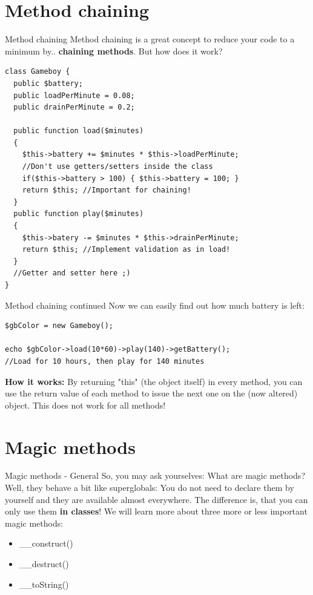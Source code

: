 \section{Method chaining}

\begin{frame}[fragile]{Method chaining}
Method chaining is a great concept to reduce your code to a minimum by.. \textbf{chaining methods}. But how does it work? \pause
\begin{lstlisting}
class Gameboy {
  public $battery;
  public loadPerMinute = 0.08;
  public drainPerMinute = 0.2;

  public function load($minutes)
  {
    $this->battery += $minutes * $this->loadPerMinute; 
    //Don't use getters/setters inside the class
 	if($this->battery > 100) { $this->battery = 100; }
    return $this; //Important for chaining!
  }
  public function play($minutes)
  {
    $this->batery -= $minutes * $this->drainPerMinute;
    return $this; //Implement validation as in load!
  }
  //Getter and setter here ;)
}
\end{lstlisting}
\end{frame}


\begin{frame}[fragile]{Method chaining continued}
Now we can easily find out how much battery is left: \pause
\begin{lstlisting}
$gbColor = new Gameboy();

echo $gbColor->load(10*60)->play(140)->getBattery();
//Load for 10 hours, then play for 140 minutes
\end{lstlisting} \pause
\textbf{How it works:} By returning "this" (the object itself) in every method, you can use the return value of each method to issue the next one on the (now altered) object. \pause This does not work for all methods!
\end{frame}


\section{Magic methods}

\begin{frame}[fragile]{Magic methods - General}
So, you may ask yourselves: What are magic methods? \pause
Well, they behave a bit like superglobals: You do not need to declare them by yourself and they are available almost everywhere. \pause The difference is, that you can only use them \textbf{in classes}! We will learn more about three more or less important magic methods: \pause
\begin{itemize}
	\item \_{}\_{}construct()
	\item \_{}\_{}destruct()
	\item \_{}\_{}toString()
\end{itemize}
\end{frame}

